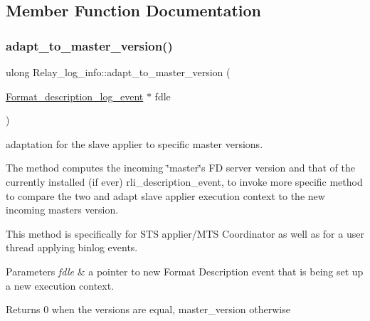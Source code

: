 \subsection{Member Function Documentation}
\mbox{\label{classRelay__log__info_a882c4b69a10aec9768aac5a01fad52d7}} 
\subsubsection{\texorpdfstring{adapt\+\_\+to\+\_\+master\+\_\+version()}{adapt\_to\_master\_version()}}
{\footnotesize\ttfamily ulong Relay\+\_\+log\+\_\+info\+::adapt\+\_\+to\+\_\+master\+\_\+version (\begin{DoxyParamCaption}\item[{\mbox{\hyperlink{classFormat__description__log__event}{Format\+\_\+description\+\_\+log\+\_\+event}} $\ast$}]{fdle }\end{DoxyParamCaption})}

adaptation for the slave applier to specific master versions.

The method computes the incoming \char`\"{}master\char`\"{}\textquotesingle{}s FD server version and that of the currently installed (if ever) rli\+\_\+description\+\_\+event, to invoke more specific method to compare the two and adapt slave applier execution context to the new incoming master\textquotesingle{}s version.

This method is specifically for S\+TS applier/\+M\+TS Coordinator as well as for a user thread applying binlog events.


\begin{DoxyParams}{Parameters}
{\em fdle} & a pointer to new Format Description event that is being set up a new execution context. \\
\hline
\end{DoxyParams}
\begin{DoxyReturn}{Returns}
0 when the versions are equal, master\+\_\+version otherwise 
\end{DoxyReturn}
\mbox{\label{classRelay__log__info_ad03fd94a6b3f52af2e271953ea446f85}} 
